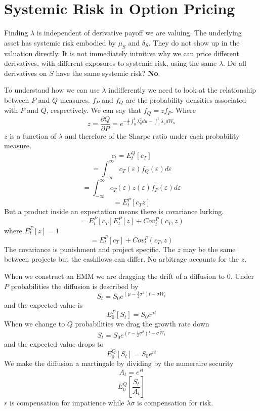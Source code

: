 
\section{Systemic Risk in Option Pricing}

Finding $\lambda$ is independent of derivative payoff we are valuing. The
underlying asset has systemic risk embodied by $\mu_S$ and $\delta_S$. They do
not show up in the valuation directly. It is not immediately intuitive why we
can price different derivatives, with different exposures to systemic risk,
using the same $\lambda$. Do all derivatives on $S$ have the same systemic
risk? \textbf{No}.

To understand how we can use $\lambda$ indifferently we need to look at the
relationship between $P$ and $Q$ measures.
$f_P$ and $f_Q$ are the probability densities associated with $P$ and $Q$,
respectively. We can say that $f_Q=zf_P$. Where
$$z=\frac{\partial Q}{\partial P}=
e^{-\frac{1}{2}\int_0^t\lambda_u^2du-\int_0^t\lambda_udW_u}$$
$z$ is a function of $\lambda$ and therefore of the Sharpe ratio under each
probability measure.
\[c_t=E_t^Q[c_T]\]
\[=\int_{-\infty}^{\infty}c_T(\varepsilon)f_Q(\varepsilon)d\varepsilon\]
\[
  =\int_{-\infty}^{\infty}c_T(\varepsilon)z(\varepsilon)
  f_P(\varepsilon)d\varepsilon
\]
\[=E_t^P[c_Tz]\]
But a product inside an expectation means there is covariance lurking.
\[=E_t^P[c_T]E_t^P[z]+Cov_t^P(c_T,z)\]
where $E_t^P[z]=1$
\[=E_t^P[c_T]+Cov_t^P(c_T,z)\]
The covariance is punishment and project specific. The $z$ may be the same
between projects but the cashflows can differ. No arbitrage accounts for the
$z$.

When we construct an EMM we are dragging the drift of a diffusion to $0$. Under
$P$ probabilities the diffusion is described by
\[S_t=S_0e^{(\mu-\frac{1}{2}\sigma^2)t-\sigma W_t}\]
and the expected value is
\[E_0^P[S_t]=S_0e^{\mu t}\]
When we change to $Q$ probabilities we drag the growth rate down
\[S_t=S_0e^{(r-\frac{1}{2}\sigma^2)t-\sigma\tilde{W}_t}\]
and the expected value drops to
\[E_0^Q[S_t]=S_0e^{rt}\]
We make the diffusion a martingale by dividing by the numeraire security
\[A_t=e^{rt}\]
\[E_0^Q\left[\frac{S_t}{A_t}\right]\]
$r$ is compensation for impatience while $\lambda\sigma$ is compensation for
risk.
